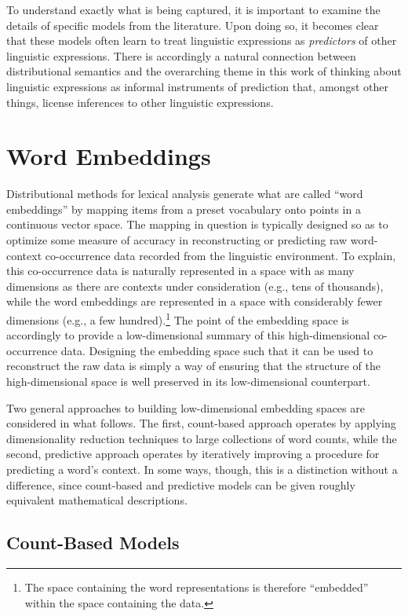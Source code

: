 To understand exactly what is being captured, it is important to examine the details of specific models from the literature. Upon doing so, it becomes clear that these models often learn to treat linguistic expressions as \textit{predictors} of other linguistic expressions. There is accordingly a natural connection between distributional semantics and the overarching theme in this work of thinking about linguistic expressions as informal instruments of prediction that, amongst other things, license inferences to other linguistic expressions.

\section{Word Embeddings}

Distributional methods for lexical analysis generate what are called ``word embeddings'' by mapping items from a preset vocabulary onto points in a continuous vector space. The mapping in question is typically designed so as to optimize some measure of accuracy in reconstructing or predicting raw word-context co-occurrence data recorded from the linguistic environment. To explain, this co-occurrence data is naturally represented in a space with as many dimensions as there are contexts under consideration (e.g., tens of thousands), while the word embeddings are represented in a space with considerably fewer dimensions (e.g., a few hundred).\footnote{The space containing the word representations is therefore ``embedded'' within the space containing the data.} The point of the embedding space is accordingly to provide a low-dimensional summary of this high-dimensional co-occurrence data. Designing the embedding space such that it can be used to reconstruct the raw data is simply a way of ensuring that the structure of the high-dimensional space is well preserved in its low-dimensional counterpart. 

Two general approaches to building low-dimensional embedding spaces are considered in what follows. The first, count-based approach operates by applying dimensionality reduction techniques to large collections of word counts, while the second, predictive approach operates by iteratively improving a procedure for predicting a word's context. In some ways, though, this is a distinction without a difference, since count-based and predictive models can be given roughly equivalent mathematical descriptions. 

\subsection{Count-Based Models}

